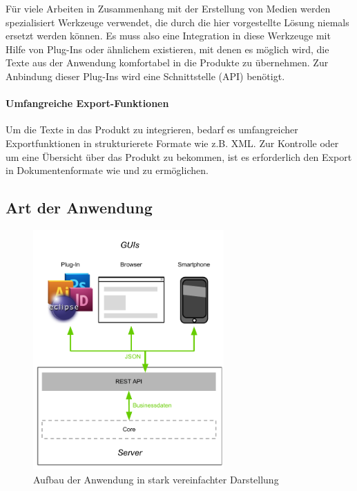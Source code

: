 Für viele Arbeiten in Zusammenhang mit der Erstellung von Medien werden spezialisiert Werkzeuge verwendet, die durch die hier vorgestellte Lösung niemals ersetzt werden können. Es muss also eine Integration in diese Werkzeuge mit Hilfe von Plug-Ins oder ähnlichem existieren, mit denen es möglich wird, die Texte aus der Anwendung komfortabel in die Produkte zu übernehmen. Zur Anbindung dieser Plug-Ins wird eine Schnittstelle (API) benötigt.

\paragraph{Umfangreiche Export-Funktionen}

Um die Texte in das Produkt zu integrieren, bedarf es umfangreicher Exportfunktionen in strukturierete Formate wie z.B. XML. Zur Kontrolle oder um eine Übersicht über das Produkt zu bekommen, ist es erforderlich den Export in Dokumentenformate wie  und  zu ermöglichen.

\pagebreak

\subsection{Art der Anwendung}\label{l:loesungsart}

\begin{figure}[htb]
\begin{center}
\includegraphics[width=0.65\textwidth]{media/ArtdesSystems.pdf}
\caption{Aufbau der Anwendung in stark vereinfachter Darstellung}
\label{chart:aufbaudessystems}
\end{center}
\end{figure}

